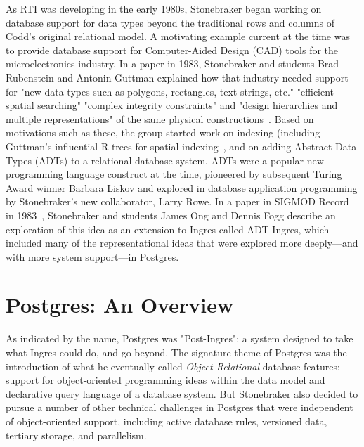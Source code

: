 \documentclass[sigconf,natbib=false]{acmart}
\begin{document}
As RTI was developing in the early 1980s, Stonebraker began working on database support for data types beyond the traditional rows and columns of Codd's original relational model. A motivating example current at the time was to provide database support for Computer-Aided Design (CAD) tools for the microelectronics industry. In a paper in 1983, Stonebraker and students Brad Rubenstein and Antonin Guttman explained how that industry needed support for "new data types such as polygons, rectangles, text strings, etc." "efficient spatial searching" "complex integrity constraints" and "design hierarchies and multiple representations" of the same physical constructions~\cite{stonebraker1983application}. Based on motivations such as these, the group started work on indexing (including Guttman's influential R-trees for spatial indexing~\cite{Guttman:1984:RDI:602259.602266}, and on adding Abstract Data Types (ADTs) to a relational database system. ADTs were a popular new programming language construct at the time, pioneered by subsequent Turing Award winner Barbara Liskov and explored in database application programming by Stonebraker's new collaborator, Larry Rowe. In a paper in SIGMOD Record in 1983~\cite{ong1983implementation}, Stonebraker and students James Ong and Dennis Fogg describe an exploration of this idea as an extension to Ingres called ADT-Ingres, which included many of the representational ideas that were explored more deeply---and with more system support---in Postgres.

\section{Postgres: An Overview}

As indicated by the name, Postgres was "Post-Ingres": a system designed to take what Ingres could do, and go beyond. The signature theme of Postgres was the introduction of what he eventually called \textit{Object-Relational} database features: support for object-oriented programming ideas within the data model and declarative query language of a database system. But Stonebraker also decided to pursue a number of other technical challenges in Postgres that were independent of object-oriented support, including active database rules, versioned data, tertiary storage, and parallelism. 
\end{document}
